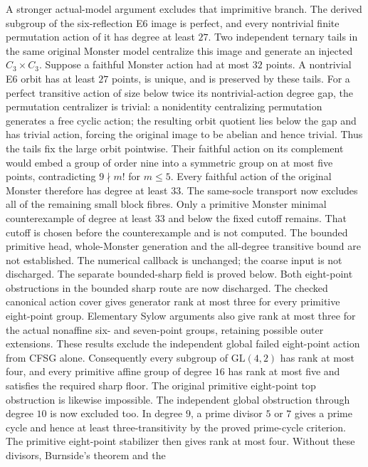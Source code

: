 A stronger actual-model argument excludes that imprimitive branch.
The derived subgroup of the six-reflection E6 image is perfect, and
every nontrivial finite permutation action of it has degree at least
$27$. Two independent ternary tails in the same original Monster model
centralize this image and generate an injected $C_3\times C_3$.
Suppose a faithful Monster action had at most $32$ points. A nontrivial
E6 orbit has at least $27$ points, is unique, and is preserved by these
tails. For a perfect transitive action of size below twice its
nontrivial-action degree gap, the permutation centralizer is trivial:
a nonidentity centralizing permutation generates a free cyclic action;
the resulting orbit quotient lies below the gap and has trivial action,
forcing the original image to be abelian and hence trivial.
Thus the tails fix the large orbit pointwise. Their faithful action on
its complement would embed a group of order nine into a symmetric group
on at most five points, contradicting $9\nmid m!$ for $m\leq5$.
Every faithful action of the original Monster therefore has degree at
least $33$. The same-socle transport now excludes all of the remaining
small block fibres. Only a primitive Monster minimal counterexample of
degree at least $33$ and below the fixed cutoff remains. That cutoff
is chosen before the counterexample and is not computed. The bounded
primitive head, whole-Monster generation and the all-degree transitive
bound are not established. The numerical callback is unchanged; the
coarse input is not discharged. The separate bounded-sharp field is
proved below.
Both eight-point obstructions in the bounded sharp route are now
discharged. The checked canonical action cover gives generator rank at
most three for every primitive eight-point group. Elementary Sylow
arguments also give rank at most three for the actual nonaffine
six- and seven-point groups, retaining possible outer extensions.
These results exclude the independent global failed eight-point
action from CFSG alone. Consequently every subgroup of
$\mathrm{GL}(4,2)$ has rank at most four, and every primitive affine
group of degree $16$ has rank at most five and satisfies the required
sharp floor. The original primitive eight-point top obstruction is
likewise impossible. The independent global obstruction through degree
$10$ is now excluded too. In degree $9$, a prime divisor $5$ or $7$
gives a prime cycle and hence at least three-transitivity by the proved
prime-cycle criterion. The primitive eight-point stabilizer then gives
rank at most four. Without these divisors, Burnside's theorem and the
